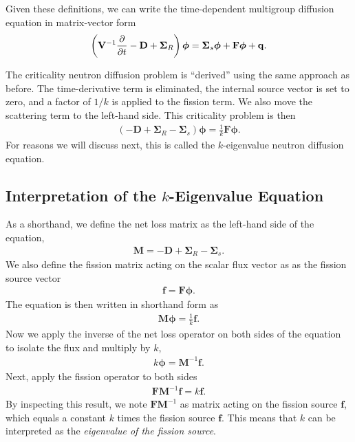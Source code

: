 Given these definitions, we can write the time-dependent multigroup diffusion equation in matrix-vector form
\begin{align}
  \left( \mathbf{V}^{-1} \frac{ \partial {} }{ \partial {t} } - \mathbf{D} + \boldsymbol\Sigma_R \right) \boldsymbol\phi
  =  \boldsymbol\Sigma_s \boldsymbol\phi + \mathbf{F} \boldsymbol\phi + \mathbf{q} .
\end{align}

The criticality neutron diffusion problem is ``derived'' using the same approach as before. The time-derivative term is eliminated, the internal source vector is set to zero, and a factor of $1/k$ is applied to the fission term. We also move the scattering term to the left-hand side. This criticality problem is then
\begin{align}
  \left( - \mathbf{D} + \boldsymbol\Sigma_R - \boldsymbol\Sigma_s \right) \boldsymbol\phi
  =  \frac{1}{k} \mathbf{F} \boldsymbol\phi  .
\end{align}
For reasons we will discuss next, this is called the $k$-eigenvalue neutron diffusion equation. 

\subsection{Interpretation of the $k$-Eigenvalue Equation}

As a shorthand, we define the net loss matrix as the left-hand side of the equation,
\begin{align}
  \mathbf{M} = - \mathbf{D} + \boldsymbol\Sigma_R - \boldsymbol\Sigma_s .
\end{align}
We also define the fission matrix acting on the scalar flux vector as as the fission source vector
\begin{align}
  \mathbf{f} = \mathbf{F} \boldsymbol\phi .
\end{align}
The equation is then written in shorthand form as
\begin{align}
  \mathbf{M} \boldsymbol\phi = \frac{1}{k} \mathbf{f} .
\end{align}
Now we apply the inverse of the net loss operator on both sides of the equation to isolate the flux and multiply by $k$,
\begin{align}
  k \boldsymbol\phi =  \mathbf{M}^{-1} \mathbf{f} .
\end{align}
Next, apply the fission operator to both sides
\begin{align}
   \mathbf{F} \mathbf{M}^{-1} \mathbf{f} = k \mathbf{f}.
\end{align}
By inspecting this result, we note $\mathbf{F} \mathbf{M}^{-1}$ as matrix acting on the fission source $\mathbf{f}$, which equals a constant $k$ times the fission source $\mathbf{f}$. This means that $k$ can be interpreted as the \emph{eigenvalue of the fission source}.

